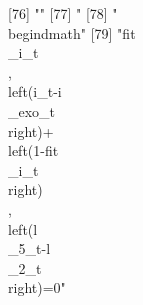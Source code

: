  [76] ""                                                                                                                                                                                                                                                                                                                                                                                                                                                                                                                                                                                                                                             
 [77] "%
 [78] "\\begin{dmath}"                                                                                                                                                                                                                                                                                                                                                                                                                                                                                                                                                                                                                               
 [79] "{{fit\\_i}_{t}}\\, \\left({i_{t}}-{{i\\_exo}_{t}}\\right)+\\left(1-{{fit\\_i}_{t}}\\right)\\, \\left({{l\\_5}_{t}}-{{l\\_2}_{t}}\\right)=0"                                                                                                                                                                                                                                                                                                                                                                                                                                                                                                   
